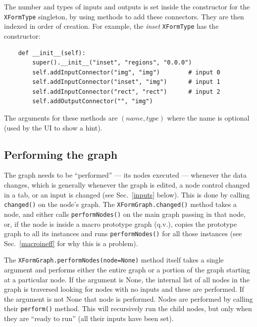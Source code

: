 The number and types of inputs and outputs is set inside the 
constructor for the \texttt{XFormType} singleton, by using methods
to add these connectors. They are then indexed in order of creation.
For example, the \emph{inset} \texttt{XFormType} has the constructor:
\begin{lstlisting}
    def __init__(self):
        super().__init__("inset", "regions", "0.0.0")
        self.addInputConnector("img", "img")        # input 0
        self.addInputConnector("inset", "img")      # input 1
        self.addInputConnector("rect", "rect")      # input 2
        self.addOutputConnector("", "img")
\end{lstlisting}
The arguments for these methods are $(name,type)$ where the name is 
optional (used by the UI to show a hint).

\subsection{Performing the graph}
\label{graphperform}
The graph needs to be ``performed'' --- its nodes executed --- whenever
the data changes, which is generally whenever the graph is edited,
a node control changed in a tab, or an input is changed (see Sec.~\ref{inputs}
below).
This is done by calling \texttt{changed()} on the node's graph.
The \texttt{XFormGraph.changed()} method takes a node, and either calls
\texttt{performNodes()} on the main graph passing in that node, or, if the
node is inside a macro prototype graph (q.v.), copies the prototype graph to
all its instances and runs \texttt{performNodes()} for all those instances
(see Sec.~\ref{macroineff} for why this is a problem).

The \texttt{XFormGraph.performNodes(node=None)} method itself takes a single
argument and performs either the entire graph or a portion of the graph
starting at a particular node. If the argument is None, the internal list of
all nodes in the graph is traversed looking for nodes with no inputs and these
are performed. If the argument is not None that node is performed. Nodes are
performed by calling their \texttt{perform()} method. This will recursively
run the child nodes, but only when they are ``ready to run'' (all their inputs
have been set). 

\clearpage
